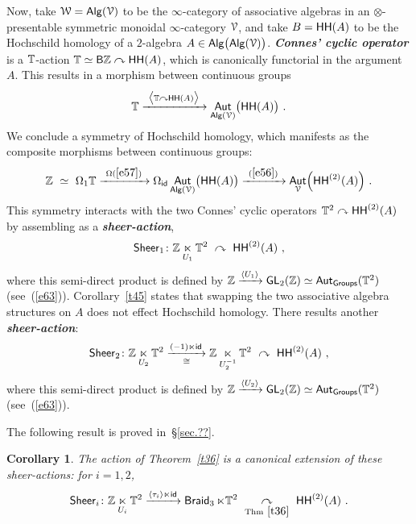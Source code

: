 \documentclass{amsart}
\newtheorem{cor}[theorem]{Corollary}
\theoremstyle{definition}
\theoremstyle{remark}
\DeclareMathOperator{\Alg}{\sf Alg}
\DeclareMathOperator{\Aut}{\sf Aut}
\newcommand{\bit}[1]{\textbf{\textit{#1}}}
\newcommand{\racts}{\curvearrowleft}
\newcommand{\lacts}{\curvearrowright}
\def\ot{\otimes}
\newcommand{\lag}{\langle}
\newcommand{\rag}{\rangle}
\newcommand{\xra}{\xrightarrow}
\newcommand{\xla}{\xleftarrow}
\DeclareMathOperator{\Braid}{{\sf Braid}_3}
\DeclareMathOperator{\GL}{\sf GL}
\DeclareMathOperator{\id}{\sf id}
\DeclareMathOperator{\sHH}{\sf HH}
\DeclareMathOperator{\HHt}{{\sf HH}^{(2)}}
\begin{document}
Now, take $\cW = \Alg(\cV)$ to be the $\infty$-category of associative algebras in an $\ot$-presentable symmetric monoidal $\infty$-category $\mathcal V$, and take $B = \sHH(A)$ to be the Hochschild homology of a $2$-algebra $A\in \Alg\bigl( \Alg(\cV) \bigr)$. 
\bit{Connes' cyclic operator} is a $\mathbb T$-action $\TT\simeq \sB \ZZ \lacts \sHH(A)$, which is canonically functorial in the argument $A$.  
This results in a morphism between continuous groups
\begin{equation}
\label{e57}
\TT
\xra{~\bigl \lag \TT \lacts \sHH(A) \bigr \rag~}
\Aut_{\Alg(\cV)}\bigl( \sHH(A) \bigr)
~.
\end{equation}
We conclude a symmetry of Hochschild homology, which manifests as the composite morphisms between continuous groups:
\[
\ZZ
~\simeq~
\Omega_1 \TT
\xra{~\Omega (\ref{e57}) ~}
\Omega_{\id} \Aut_{\Alg(\cV)}\bigl( \sHH(A) \bigr)
\xra{~(\ref{e56})~}
\Aut_{\cV}\Bigl( \HHt(A) \Bigr)
~.
\]
This symmetry interacts with the two Connes' cyclic operators $\TT^2 \lacts \HHt(A)$ by assembling as a \bit{sheer-action},
\begin{equation}
\label{e60}
{\sf Sheer}_1
\colon
\ZZ
\underset{U_1}\ltimes
\TT^2
~\lacts~
\HHt(A) 
~,
\end{equation}
where this semi-direct product is defined by $\ZZ\xra{\lag  U_1 \rag} \GL_2(\ZZ)\simeq \Aut_{\sf Groups}(\TT^2)$ (see~(\ref{e63})).
Corollary~\ref{t45} states that swapping the two associative algebra structures on $A$ does not effect Hochschild homology.
There results another \bit{sheer-action}:
\begin{equation}
\label{e71}
{\sf Sheer}_2
\colon
\ZZ 
\underset{U_2}\ltimes
\TT^2
\underset{\cong}{\xra{(-1) \ltimes \id}}
\ZZ
\underset{U_2^{-1}}\ltimes
\TT^2
~\lacts~
\HHt(A) 
~,
\end{equation}
where this semi-direct product is defined by $\ZZ\xra{\lag  U_2 \rag} \GL_2(\ZZ)\simeq \Aut_{\sf Groups}(\TT^2)$ (see~(\ref{e63})).


The following result is proved in~\S\ref{sec.??}.
\begin{cor}
\label{t55}
The action of Theorem~\ref{t36} is a canonical extension of these sheer-actions:
for $i=1,2$, 
\[
{\sf Sheer}_i
\colon
\ZZ
\underset{ U_i }\ltimes \TT^2 
\xra{\lag \tau_i \rag \ltimes \id}
\Braid \ltimes \TT^2 
~\underset{\rm Thm~\ref{t36}}\lacts~
\HHt(A)
~.
\]

\end{cor}
\end{document}
